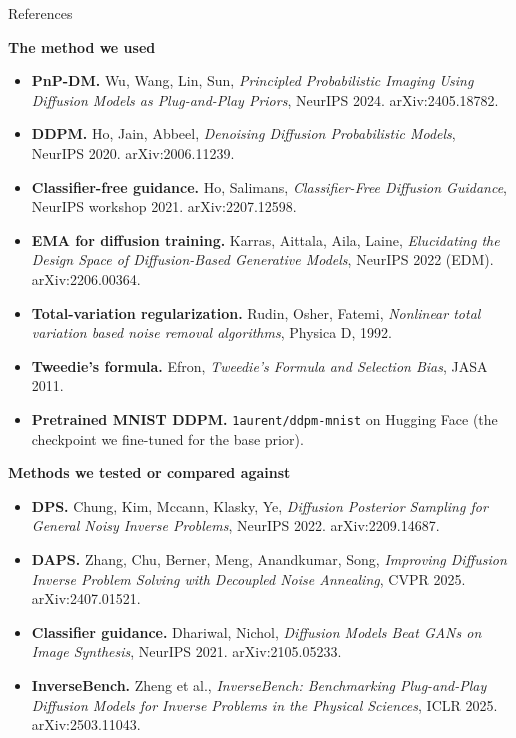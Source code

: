 \documentclass[aspectratio=169,10pt]{beamer}
\begin{document}
\begin{frame}{References}
\scriptsize

\textbf{The method we used}
\begin{itemize}\itemsep=1pt
\item \textbf{PnP-DM.} Wu, Wang, Lin, Sun, \emph{Principled Probabilistic
Imaging Using Diffusion Models as Plug-and-Play Priors}, NeurIPS 2024.
arXiv:2405.18782.
\item \textbf{DDPM.} Ho, Jain, Abbeel, \emph{Denoising Diffusion
Probabilistic Models}, NeurIPS 2020. arXiv:2006.11239.
\item \textbf{Classifier-free guidance.} Ho, Salimans,
\emph{Classifier-Free Diffusion Guidance}, NeurIPS workshop 2021.
arXiv:2207.12598.
\item \textbf{EMA for diffusion training.} Karras, Aittala, Aila,
Laine, \emph{Elucidating the Design Space of Diffusion-Based Generative
Models}, NeurIPS 2022 (EDM). arXiv:2206.00364.
\item \textbf{Total-variation regularization.} Rudin, Osher, Fatemi,
\emph{Nonlinear total variation based noise removal algorithms},
Physica D, 1992.
\item \textbf{Tweedie's formula.} Efron, \emph{Tweedie's Formula and
Selection Bias}, JASA 2011.
\item \textbf{Pretrained MNIST DDPM.} \texttt{1aurent/ddpm-mnist} on
Hugging Face (the checkpoint we fine-tuned for the base prior).
\end{itemize}

\textbf{Methods we tested or compared against}
\begin{itemize}\itemsep=1pt
\item \textbf{DPS.} Chung, Kim, Mccann, Klasky, Ye, \emph{Diffusion
Posterior Sampling for General Noisy Inverse Problems}, NeurIPS 2022.
arXiv:2209.14687.
\item \textbf{DAPS.} Zhang, Chu, Berner, Meng, Anandkumar, Song,
\emph{Improving Diffusion Inverse Problem Solving with Decoupled Noise
Annealing}, CVPR 2025. arXiv:2407.01521.
\item \textbf{Classifier guidance.} Dhariwal, Nichol, \emph{Diffusion
Models Beat GANs on Image Synthesis}, NeurIPS 2021. arXiv:2105.05233.
\item \textbf{InverseBench.} Zheng et al., \emph{InverseBench: Benchmarking
Plug-and-Play Diffusion Models for Inverse Problems in the Physical
Sciences}, ICLR 2025. arXiv:2503.11043.
\end{itemize}


\end{frame}
\end{document}
